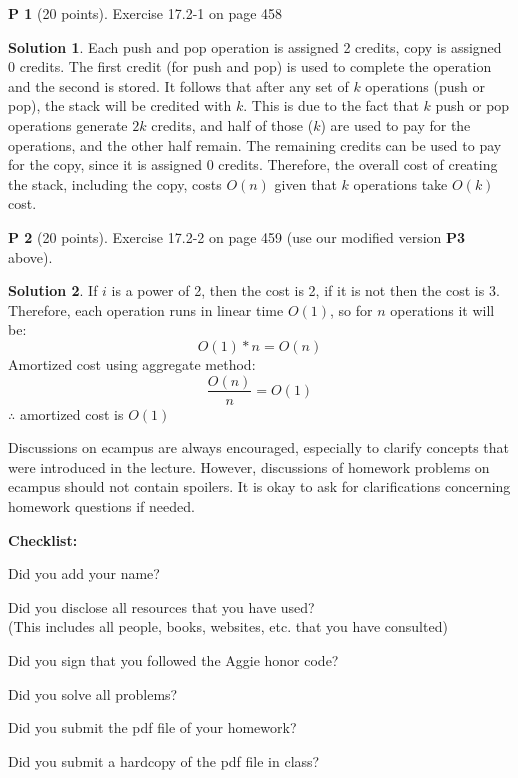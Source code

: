 \documentclass{article}
\theoremstyle{definition}
\newtheorem{problem}{P}
\newtheorem*{solution}{Solution}
\newcommand{\checklist}{\noindent\textbf{Checklist:}
\begin{compactitem}[$\Box$] 
\item Did you add your name? 
\item Did you disclose all resources that you have used? \\
(This includes all people, books, websites, etc. that you have consulted)
\item Did you sign that you followed the Aggie honor code? 
\item Did you solve all problems? 
\item Did you submit the pdf file
  of your homework?
\item Did you submit a hardcopy of the pdf file in class? 
\end{compactitem}
}
\begin{document}
\begin{problem}[20 points]
Exercise 17.2-1 on page 458
\end{problem}
\begin{solution}
Each push and pop operation is assigned 2 credits, copy is assigned 0 credits. The first credit (for push and pop) is used to complete the operation and the second is stored. It follows that after any set of $k$ operations (push or pop), the stack will be credited with $k$. This is due to the fact that $k$ push or pop operations generate $2k$ credits, and half of those ($k$) are used to pay for the operations, and the other half remain. The remaining credits can be used to pay for the copy, since it is assigned 0 credits. Therefore, the overall cost of creating the stack, including the copy, costs $O(n)$ given that $k$ operations take $O(k)$ cost.
\end{solution}

\begin{problem}[20 points]
Exercise 17.2-2 on page 459 (use our modified version \textbf{P3} above). 
\end{problem}
\begin{solution}
If $i$ is a power of 2, then the cost is 2, if it is not then the cost is 3.\\
Therefore, each operation runs in linear time $O(1)$, so for $n$ operations it will be:
$$ O(1) * n = O(n) $$
Amortized cost using aggregate method:
$$ \frac{O(n)}{n} = O(1) $$
$\therefore$ amortized cost is $O(1)$
\end{solution}






Discussions on ecampus are always encouraged, especially to clarify
concepts that were introduced in the lecture. However, discussions of
homework problems on ecampus should not contain spoilers. It is okay to
ask for clarifications concerning homework questions if needed. 
\medskip

\goodbreak
\checklist
\end{document}
